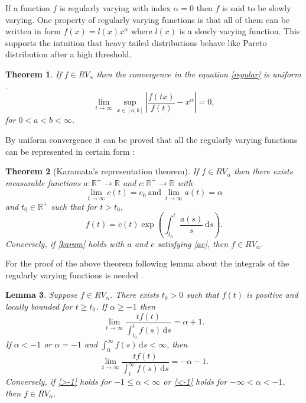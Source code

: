 \documentclass[english,12pt,a4paper,pdftex,sci,utf8]{aaltothesis} %
\newtheorem{theorem}{Theorem}[section]
\newtheorem{lemma}[theorem]{Lemma}
\begin{document}
If a function $f$  is regularly varying with index $\alpha=0$ then $f$ is said to be slowly varying. One property of regularly varying functions is that all of them can be written in form $f(x)=l(x)x^{\alpha}$ where $l(x)$ is a slowly varying function. This supports the intuition that heavy tailed distributions behave like Pareto distribution after a high threshold. 



\begin{theorem}
If $f \in RV_{\alpha}$ then the convergence in the equation \eqref{regular} is uniform .
\begin{equation*}
\lim_{t \rightarrow \infty} \sup_{x  \in [a,b]} \left| \frac{f(tx)}{f(t)} - x^{\alpha} \right| = 0,
\end{equation*}
for $0<a<b<\infty$.
\label{uniform}
\end{theorem}



By uniform convergence it can be proved that all the regularly varying functions can be represented in certain form \cite{deHaan}:

\begin{theorem}[Karamata's representation theorem]
If $f \in RV_{\alpha}$ then there exists measurable functions $a: \mathbb{R^+} \rightarrow \mathbb{R}$ and $c: \mathbb{R^+} \rightarrow \mathbb{R}$ with
\begin{equation}
\lim_{t \rightarrow \infty} c(t) = c_0 \  \text{and} \  \lim_{t \rightarrow \infty} a(t) = \alpha
\label{ac}
\end{equation}
and $t_0 \in \mathbb{R^+}$ such that for $t > t_0$,
\begin{equation}
f(t) = c(t) \exp \left(\int_{t_0}^{t}  \frac{a(s)}{s} \, \mathrm{d}s \right).
\label{karam}
\end{equation}
Conversely, if \eqref{karam} holds with $a$ and $c$ satisfying \eqref{ac}, then $f \in RV_{\alpha}$.
\label{karamata}
\end{theorem}

For the proof of the above theorem following lemma about the integrals of the regularly varying functions is needed \cite{deHaan}.

\begin{lemma}
Suppose $f \in RV_{\alpha}$. There exists $t_0 > 0$ such that $f(t)$ is positive and locally bounded for $t \geq t_0$. If $\alpha \geq -1$ then
\begin{equation}
\lim_{t \rightarrow \infty} \frac{tf(t)}{\int_{t_0}^{t}f(s) \, \mathrm{d}s} = \alpha + 1.
\label{>-1}
\end{equation}
If $\alpha<-1$ or $\alpha= -1$ and $\int_{0}^{\infty}f(s) \, \mathrm{d}s<\infty$, then
\begin{equation}
\lim_{t \rightarrow \infty} \frac{tf(t)}{\int_{t}^{\infty} f(s) \, \mathrm{d}s} = -\alpha - 1.
\label{<-1}
\end{equation}
Conversely, if \eqref{>-1} holds for $-1\leq \alpha < \infty$ or \eqref{<-1} holds for $-\infty<\alpha<-1$, then $f \in RV_{\alpha}$.
\label{karamlemma}
\end{lemma}
\end{document}
